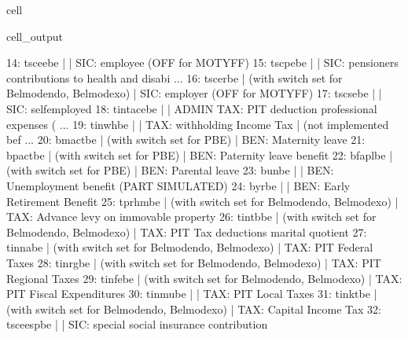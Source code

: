 \documentclass[letterpaper,10pt,english]{sphinxmanual}
\begin{document}
\begin{sphinxuseclass}{cell}
\begin{sphinxuseclass}{cell_output}
\begin{sphinxVerbatim}[commandchars=\\\{\}]
14: tscee\PYGZus{}be             |                                                       |    SIC: employee (OFF for MOTYFF) 
15: tscpe\PYGZus{}be             |                                                       |    SIC: pensioners contributions to health and disabi ... 
16: tscer\PYGZus{}be             |  (with switch set for Belmod\PYGZus{}endo, Belmod\PYGZus{}exo)        |    SIC: employer (OFF for MOTYFF) 
17: tscse\PYGZus{}be             |                                                       |    SIC: self\PYGZhy{}employed 
18: tintace\PYGZus{}be           |                                                       |    ADMIN TAX: PIT \PYGZhy{} deduction professional expenses ( ... 
19: tinwh\PYGZus{}be             |                                                       |    TAX: withholding Income Tax | (not implemented bef ... 
20: bmact\PYGZus{}be             |  (with switch set for PBE)                            |    BEN: Maternity leave 
21: bpact\PYGZus{}be             |  (with switch set for PBE)                            |    BEN: Paternity leave benefit 
22: bfapl\PYGZus{}be             |  (with switch set for PBE)                            |    BEN: Parental leave 
23: bun\PYGZus{}be               |                                                       |    BEN: Unemployment benefit (PART SIMULATED)  
24: byr\PYGZus{}be               |                                                       |    BEN: Early Retirement Benefit 
25: tprhm\PYGZus{}be             |  (with switch set for Belmod\PYGZus{}endo, Belmod\PYGZus{}exo)        |    TAX: Advance levy on immovable property 
26: tintb\PYGZus{}be             |  (with switch set for Belmod\PYGZus{}endo, Belmod\PYGZus{}exo)        |    TAX: PIT \PYGZhy{} Tax deductions \PYGZam{} marital quotient 
27: tinna\PYGZus{}be             |  (with switch set for Belmod\PYGZus{}endo, Belmod\PYGZus{}exo)        |    TAX: PIT \PYGZhy{} Federal Taxes 
28: tinrg\PYGZus{}be             |  (with switch set for Belmod\PYGZus{}endo, Belmod\PYGZus{}exo)        |    TAX: PIT \PYGZhy{} Regional Taxes 
29: tinfe\PYGZus{}be             |  (with switch set for Belmod\PYGZus{}endo, Belmod\PYGZus{}exo)        |    TAX: PIT \PYGZhy{} Fiscal Expenditures 
30: tinmu\PYGZus{}be             |                                                       |    TAX: PIT \PYGZhy{} Local Taxes 
31: tinkt\PYGZus{}be             |  (with switch set for Belmod\PYGZus{}endo, Belmod\PYGZus{}exo)        |    TAX: Capital Income Tax 
32: tsceesp\PYGZus{}be           |                                                       |    SIC: special social insurance contribution 

\end{sphinxVerbatim}
\end{sphinxuseclass}
\end{sphinxuseclass}
\end{document}
